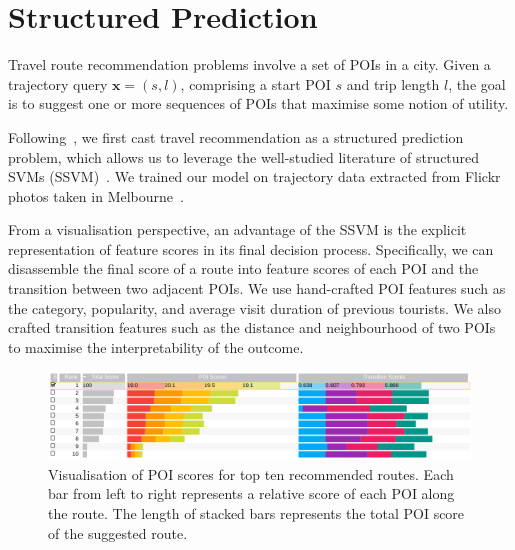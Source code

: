 \section{Structured Prediction}
Travel route recommendation problems involve a set of POIs in a city. 
Given a trajectory query $\mathbf{x} = (s, l)$, comprising a start POI $s$ and trip length $l$, the goal is to suggest one or more sequences of POIs that maximise some notion of utility.

Following~\cite{chen2017SR}, we first cast travel recommendation as a structured prediction problem, which allows us to leverage the well-studied literature of structured SVMs (SSVM)~\cite{joachims2009predicting}. 
We trained our model on trajectory data extracted from Flickr photos taken in Melbourne~\cite{chen2016learning}.

From a visualisation perspective, an advantage of the SSVM is the explicit representation of feature scores in its final decision process. Specifically, we can disassemble the final score of a route into feature scores of each POI and the transition between two adjacent POIs. 
We use hand-crafted POI features such as the category, popularity, and average visit duration of previous tourists. We also crafted transition features such as the distance and neighbourhood of two POIs to maximise the interpretability of the outcome.

\begin{figure}[t!]
\includegraphics[width=\linewidth]{figure/sample_stack.png}
\caption{Visualisation of POI scores for top ten recommended routes. Each bar from left to right represents a relative score of each POI along the route.
The length of stacked bars represents the total POI score of the suggested route.}
\label{fig:stack} \vspace{-2em}
\end{figure}
